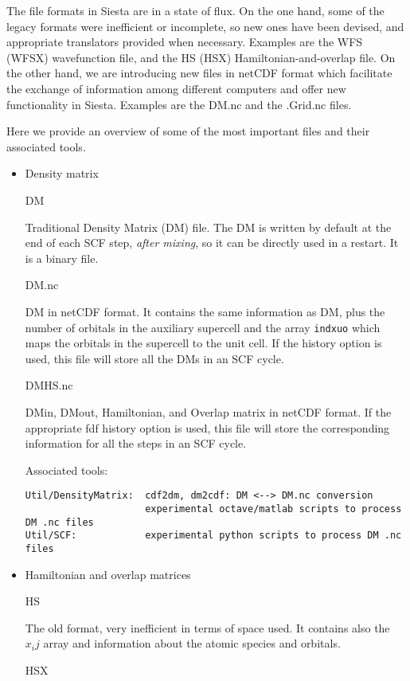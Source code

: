 \documentclass[11pt]{article}
\begin{document}
The file formats in Siesta are in a state of flux. On the one hand,
some of the legacy formats were inefficient or incomplete, so new ones
have been devised, and appropriate translators provided when
necessary.  Examples are the WFS (WFSX) wavefunction file, and the HS
(HSX) Hamiltonian-and-overlap file. On the other hand, we are
introducing new files in netCDF format which facilitate the exchange
of information among different computers and offer new functionality
in Siesta. Examples are the DM.nc and the .Grid.nc files.

Here we provide an overview of some of the most important files and their
associated tools.

\begin{itemize}
\item{Density matrix}

DM

Traditional Density Matrix (DM) file. The DM is written by default at
the end of each SCF step, {\em after mixing}, so it can be directly used
in a restart. It is a binary file.

DM.nc

DM in netCDF format. It contains the same information as DM, plus the
number of orbitals in the auxiliary supercell and the array {\tt indxuo}
which maps the orbitals in the supercell to the unit cell.  If the history
option is used, this file will store all the DMs in an SCF cycle.

DMHS.nc

DMin, DMout, Hamiltonian, and Overlap matrix in netCDF format. If the
appropriate fdf history option is used, this file will store the
corresponding information for all the steps in an SCF cycle.

Associated tools:

\begin{verbatim}
Util/DensityMatrix:  cdf2dm, dm2cdf: DM <--> DM.nc conversion
                     experimental octave/matlab scripts to process DM .nc files
Util/SCF:            experimental python scripts to process DM .nc files
\end{verbatim}

\item{Hamiltonian and overlap matrices}

HS

The old format, very inefficient in terms of space used. It contains
also the $x_ij$ array and information about the atomic species and orbitals.

HSX


\end{itemize}
\end{document}
